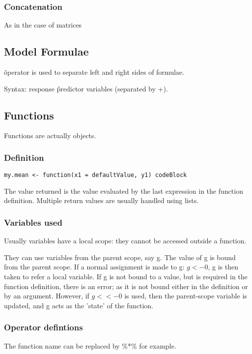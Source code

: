 \documentclass[oneside, article]{memoir}
\begin{document}
\subsubsection{Concatenation}
As in the case of matrices

\subsection{Model Formulae}
\~ operator is used to separate left and right sides of formulae.

Syntax: response \~ predictor variables (separated by +).

\subsection{Functions}
Functions are actually objects.

\subsubsection{Definition}
\begin{verbatim}
my.mean <- function(x1 = defaultValue, y1) codeBlock
\end{verbatim}

The value returned is the value evaluated by the last expression in the function definition. Multiple return values are usually handled using lists.

\subsubsection{Variables used}
Usually variables have a local scope: they cannot be accessed outside a function.

They can use variables from the parent scope, say g. The value of g is bound from the parent scope. If a normal assignment is made to g: $g <- 0$, g is then taken to refer a local variable. If g is not bound to a value, but is required in the function definition, there is an error; as it is not bound either in the definition or by an argument. However, if $g <<- 0$ is used, then the parent-scope variable is updated, and g acts as the 'state' of the function.

\subsubsection{Operator defintions}
The function name can be replaced by \%*\% for example.
\end{document}
